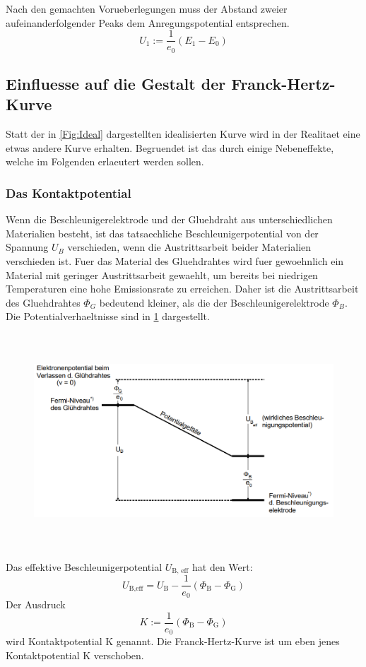 \noindent Nach den gemachten Vorueberlegungen muss der Abstand zweier aufeinanderfolgender Peaks dem Anregungspotential entsprechen.
\begin{equation}
    U_1:=\frac{1}{e_0}(E_1-E_0)
\end{equation}
\subsection{Einfluesse auf die Gestalt der Franck-Hertz-Kurve}
Statt der in \ref{Fig:Ideal} dargestellten idealisierten Kurve wird in der Realitaet eine etwas andere Kurve erhalten. Begruendet ist das durch einige Nebeneffekte, welche im Folgenden erlaeutert werden sollen.
\subsubsection{Das Kontaktpotential}
Wenn die Beschleunigerelektrode und der Gluehdraht aus unterschiedlichen Materialien besteht, ist das tatsaechliche Beschleunigerpotential von der Spannung $U_B$ verschieden, wenn die Austrittsarbeit beider Materialien verschieden ist. Fuer das Material des Gluehdrahtes wird fuer gewoehnlich ein Material mit geringer Austrittsarbeit gewaehlt, um bereits bei niedrigen Temperaturen eine hohe Emissionsrate zu erreichen. Daher ist die Austrittsarbeit des Gluehdrahtes $\Phi_G$ bedeutend kleiner, als die der Beschleunigerelektrode $\Phi_B$. Die Potentialverhaeltnisse sind in \ref{Fig:Potential} dargestellt.
\begin{figure}[H]
    \centering
    \captionsetup{justification=centering}
    \includegraphics[height=8cm]{"Potential_FranckHertz.png"}
    \label{Fig:Potential}
\end{figure}
\noindent Das effektive Beschleunigerpotential $U_{\text{B, eff}}$ hat den Wert:
\begin{equation}
    U_{\text{B,eff}}=U_\text{B}-\frac{1}{e_0}(\Phi_\text{B}-\Phi_\text{G})\nonumber
\end{equation}
Der Ausdruck 
\begin{equation}
    K:=\frac{1}{e_0}(\Phi_\text{B}-\Phi_\text{G})\nonumber
\end{equation}
wird Kontaktpotential K genannt. Die Franck-Hertz-Kurve ist um eben jenes Kontaktpotential K verschoben.
